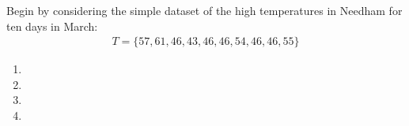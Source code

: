 Begin by considering the simple dataset of the high temperatures in Needham for ten days in March:
\begin{align*}
T = \{57, 61, 46, 43, 46, 46, 54, 46, 46, 55\}
\end{align*}

\begin{enumerate}
    \item 
    \item 
    \item 
    \item 
\end{enumerate}